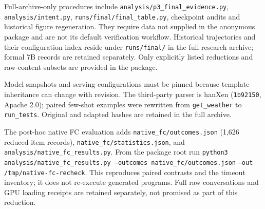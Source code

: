 Full-archive-only procedures include \texttt{analysis/p3\_final\_evidence.py},
\texttt{analysis/intent.py}, \texttt{runs/final/final\_table.py}, checkpoint audits
and historical figure regeneration. They require data not supplied in the anonymous
package and are not its default verification workflow. Historical trajectories and
their configuration index reside under \texttt{runs/final/} in the full research
archive; formal 7B records are retained separately. Only explicitly listed reductions and
raw-content subsets are provided in the package.

Model snapshots and serving configurations must be pinned because template inheritance
can change with revision. The third-party parser is hanXen (\texttt{1b92150}, Apache 2.0);
paired few-shot examples were rewritten from \texttt{get\_weather} to \texttt{run\_tests}.
Original and adapted hashes are retained in the full archive.

The post-hoc native FC evaluation adds \texttt{native\_fc/outcomes.json}
(1,626 reduced item records), \texttt{native\_fc/statistics.json}, and
\texttt{analysis/native\_fc\_results.py}. From the package root run
\texttt{python3 analysis/native\_fc\_results.py --outcomes native\_fc/outcomes.json}
\texttt{--out /tmp/native-fc-recheck}. This reproduces paired contrasts and the
timeout inventory; it does not re-execute generated programs. Full raw conversations
and GPU loading receipts are retained separately, not promised as part of this reduction.
